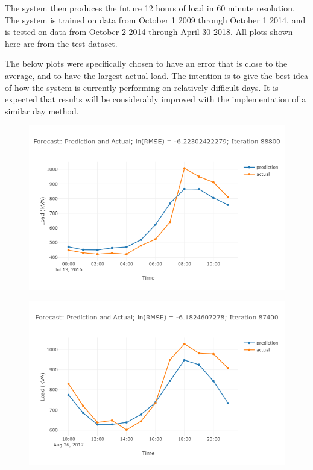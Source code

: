 The system then produces the future 12 hours of load in 60 minute resolution.
The system is trained on data from October 1 2009 through October 1 2014, and is tested on data from October 2 2014 through April 30 2018.
All plots shown here are from the test dataset.


The below plots were specifically chosen to have an error that is close to the average, and to have the largest actual load. The intention is to give the best idea of how the system is currently performing on relatively difficult days.
It is expected that results will be considerably improved with the implementation of a similar day method.
\begin{figure}
	\centering
	\includegraphics[width=0.95\linewidth]{images/prelim-plots/newplot}
	\caption{}
\end{figure}

\begin{figure}
\centering
\includegraphics[width=0.95\linewidth]{"images/prelim-plots/newplot (1)"}
\caption{}
\end{figure}

